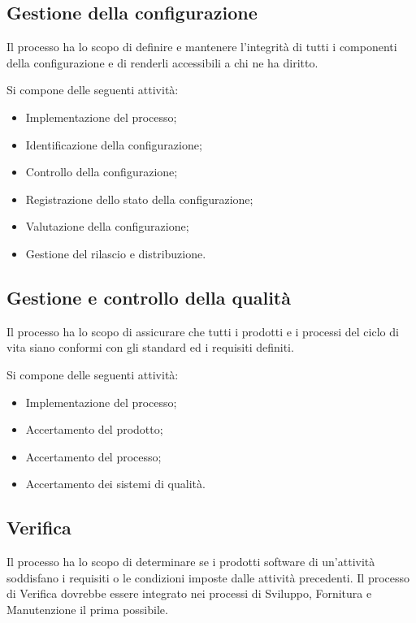 \subsection{Gestione della configurazione}

Il processo ha lo scopo di definire e mantenere l'integrità di tutti i componenti della configurazione e di renderli accessibili a chi ne ha diritto.

Si compone delle seguenti attività:
\begin{itemize}
    \item Implementazione del processo;
    \item Identificazione della configurazione;
    \item Controllo della configurazione;
    \item Registrazione dello stato della configurazione;
    \item Valutazione della configurazione;
    \item Gestione del rilascio e distribuzione.
\end{itemize}

\subsection{Gestione e controllo della qualità}

Il processo ha lo scopo di assicurare che tutti i prodotti e i processi del ciclo di vita siano conformi con gli standard ed i requisiti definiti.

Si compone delle seguenti attività:
\begin{itemize}
    \item Implementazione del processo;
    \item Accertamento del prodotto;
    \item Accertamento del processo;
    \item Accertamento dei sistemi di qualità.
\end{itemize}

\subsection{Verifica}

Il processo ha lo scopo di determinare se i prodotti software di un'attività soddisfano i requisiti o le condizioni imposte dalle attività precedenti. Il processo di Verifica dovrebbe essere integrato nei processi di Sviluppo, Fornitura e Manutenzione il prima possibile.


